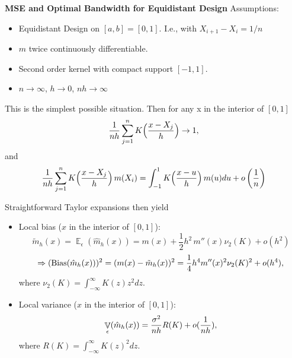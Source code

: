 \documentclass[14pt]{extreport}\usepackage[]{graphicx}\usepackage[]{xcolor}
\DeclareMathOperator{\E}{\mathbb{E}}
\DeclareMathOperator{\V}{\mathbb{V}}
\begin{document}
% 
% 

\newpage
\textbf{MSE and Optimal Bandwidth for Equidistant Design} 
\bigbreak\noindent
Assumptions: 
\begin{itemize}
\item Equidistant  Design on $[a,b]=[0,1]$. I.e., with
$X_{i+1}-X_i=1/n$
\item $m$ twice continuously differentiable.
\item Second order kernel with compact
support $[-1,1]$.
\item $n\rightarrow\infty$, $h\rightarrow 0$, $nh\rightarrow\infty$
\end{itemize}

\bigbreak

This is the simplest possible situation. Then for any x in the interior of $[0,1]$
$$\frac{1}{nh} \sum_{j=1}^n K\Big({x-X_j\over h}\Big)\rightarrow 1,$$
and
$$\frac{1}{nh} \sum_{j=1}^n K\Big({x-X_j\over h}\Big)\,m(X_i)=\int_{-1}^1 K\Big({x-u\over h}\Big)\,m(u)du+o\left(\frac{1}{n}\right)$$

Straightforward Taylor expansions then yield

\begin{itemize}
\item Local bias ($x$ in the interior of $[0,1]$): 
$$\tilde m_h(x)=\E_\epsilon\left(\hat m_h(x)\right)
=m(x)+\frac{1}{2} h^2\,m''(x) \nu_2(K)+o(h^2)$$
 $$\Rightarrow (\operatorname{Bias}({\hat m}_ h(x)))^2=(m(x)-\tilde m_h(x))^2= {1\over 4}  h^4 m''(x)^2\nu_2(K)^2
 +o(h^4),$$
where $\nu_2(K)=\int_{-\infty}^\infty K(z)z^2dz$.
\item Local variance ($x$ in the interior of $[0,1]$): 
 $$\V_\epsilon(\hat m_h(x))={\sigma^2\over nh}  R(K) +o(\frac{1}{nh}),$$
where $R(K)=\int_{-\infty}^\infty K(z)^2dz$.
\end{itemize}
\end{document}
